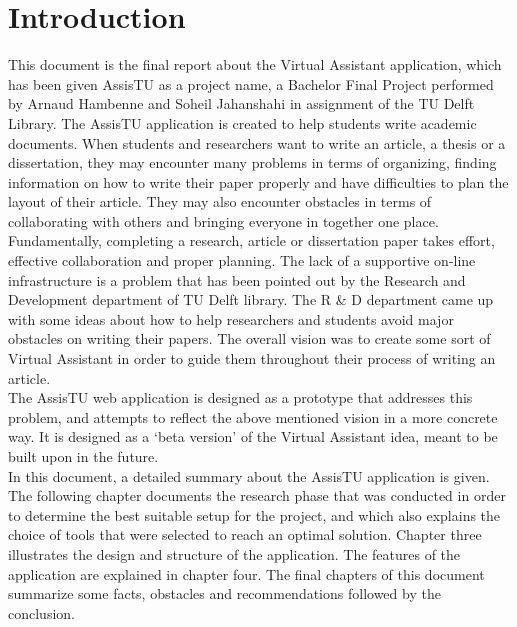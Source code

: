 \chapter{Introduction}

This document is the final report about the Virtual Assistant application, which has been given AssisTU as a project name, a Bachelor Final Project performed by Arnaud Hambenne and Soheil Jahanshahi in assignment of the TU Delft Library. The AssisTU application is created to help students write academic documents. When students and researchers want to write an article, a thesis or a dissertation, they may encounter many problems in terms of organizing, finding information on how to write their paper properly and have difficulties to plan the layout of their article. They may also encounter obstacles in terms of collaborating with others and bringing everyone in together one 
place. \\

Fundamentally, completing a research, article or dissertation paper takes effort, effective collaboration and proper planning. The lack of a supportive on-line infrastructure is a problem that has been pointed out by the Research and Development department of TU Delft library. The R \& D department came up with some ideas about how to help researchers and students avoid major obstacles on writing their papers. The overall vision was to create some sort of Virtual Assistant in order to guide them throughout their process of writing an article.\\

The AssisTU web application is designed as a prototype that addresses this problem, and attempts to reflect the above mentioned vision in a more concrete way. It is designed as a `beta version' of the Virtual Assistant idea, meant to be built upon in the future.\\ 

In this document, a detailed summary about the AssisTU application is given. The following chapter documents the research phase that was conducted in order to determine the best suitable setup for the project, and which also explains the choice of tools that were selected to reach an optimal solution. 
Chapter three illustrates the design and structure of the application. The features of the application are explained in chapter four. The final chapters of this document summarize some facts, obstacles and recommendations followed by the conclusion.  